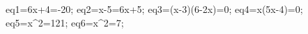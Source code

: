 \documentclass[exercice]{thedocument}%
\begin{document}
%
    \>eq1=6x+4=-20;%
    \>eq2=x-5=6x+5;%
    \>eq3=(x-3)(6-2x)=0;%
    \>eq4=x(5x-4)=0;%
    \>eq5=x^2=121;%
    \>eq6=x^2=7;%
\end{document}
